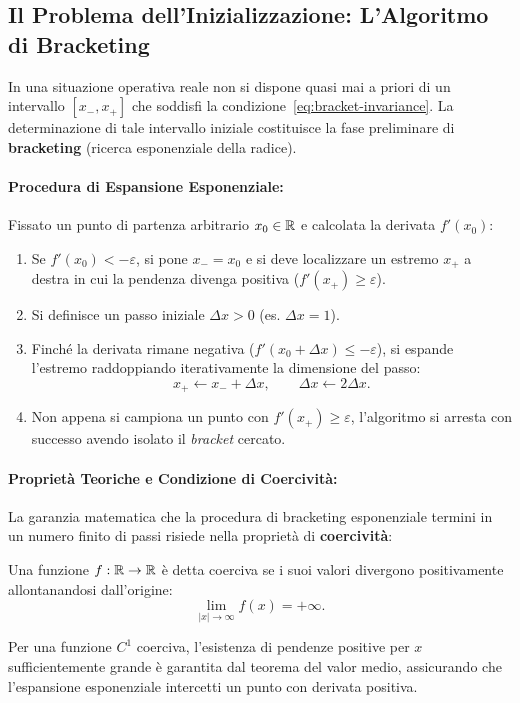 \subsection{Il Problema dell'Inizializzazione: L'Algoritmo di Bracketing}
\label{subsec:bracketing-algorithm}
In una situazione operativa reale non si dispone quasi mai a priori di un intervallo $[x_-, x_+]$ che soddisfi la condizione~\eqref{eq:bracket-invariance}. La determinazione di tale intervallo iniziale costituisce la fase preliminare di \textbf{bracketing} (ricerca esponenziale della radice).

\paragraph{Procedura di Espansione Esponenziale:}
Fissato un punto di partenza arbitrario $x_0 \in \mathbb{R}$ e calcolata la derivata $f'(x_0)$:
\begin{enumerate}
    \item Se $f'(x_0) < -\varepsilon$, si pone $x_- = x_0$ e si deve localizzare un estremo $x_+$ a destra in cui la pendenza divenga positiva ($f'(x_+) \ge \varepsilon$).
    \item Si definisce un passo iniziale $\Delta x > 0$ (es. $\Delta x = 1$).
    \item Finch\'e la derivata rimane negativa ($f'(x_0 + \Delta x) \le -\varepsilon$), si espande l'estremo raddoppiando iterativamente la dimensione del passo:
    \begin{equation}
        x_+ \leftarrow x_- + \Delta x, \qquad \Delta x \leftarrow 2 \Delta x.
        \label{eq:exponential-bracketing-step}
    \end{equation}
    \item Non appena si campiona un punto con $f'(x_+) \ge \varepsilon$, l'algoritmo si arresta con successo avendo isolato il \textit{bracket} cercato.
\end{enumerate}

\paragraph{Propriet\`a Teoriche e Condizione di Coercivit\`a:}
La garanzia matematica che la procedura di bracketing esponenziale termini in un numero finito di passi risiede nella propriet\`a di \textbf{coercivit\`a}:
\begin{definition}
Una funzione $f: \mathbb{R} \to \mathbb{R}$ \`e detta coerciva se i suoi valori divergono positivamente allontanandosi dall'origine:
\begin{equation}
    \lim_{|x| \to \infty} f(x) = +\infty.
\end{equation}
\end{definition}
Per una funzione $C^1$ coerciva, l'esistenza di pendenze positive per $x$ sufficientemente grande \`e garantita dal teorema del valor medio, assicurando che l'espansione esponenziale intercetti un punto con derivata positiva.

